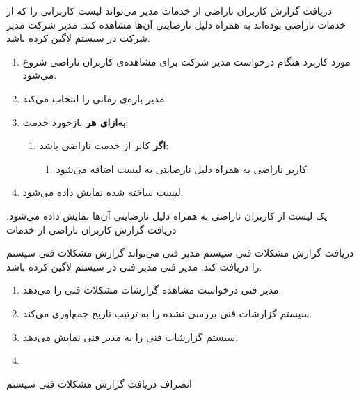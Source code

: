 {
\usecase
{دریافت گزارش کاربران ناراضی از خدمات}
{}
{مدیر می‌تواند لیست کاربرانی را که از خدمات ناراضی بوده‌اند به همراه دلیل نارضایتی آن‌ها مشاهده کند.}
{مدیر شرکت}
{}
{مدیر شرکت در سیستم لاگین کرده باشد.}
{
	\vspace*{-0.6cm}
	\begin{enumerate}
		\item 
		مورد کاربرد هنگام درخواست مدیر شرکت برای مشاهده‌ی کاربران ناراضی شروع می‌شود.
		\item
		مدیر بازه‌ی زمانی را انتخاب می‌کند.
		\item
		\textbf{به‌ازای هر} بازخورد خدمت:
		\begin{enumerate}[label=\theenumi.\arabic*.]
			\item 
			\textbf{اگر} کابر از خدمت ناراضی باشد:
			\begin{enumerate}
				\item 
				کاربر ناراضی به همراه دلیل نارضایتی به لیست اضافه می‌شود.
			\end{enumerate}
		\end{enumerate}
		\item
		لیست ساخته شده نمایش داده می‌شود.
	\end{enumerate}
}
{یک لیست از کاربران ناراضی به همراه دلیل نارضایتی آن‌ها نمایش داده می‌شود.}
{
}
{
	دریافت گزارش کاربران ناراضی از خدمات
}
}

{
	\usecase
	{دریافت گزارش مشکلات فنی سیستم}
	{}
	{مدیر فنی می‌تواند گزارش مشکلات فنی سیستم را دریافت کند.}
	{مدیر فنی}
	{}
	{مدیر فنی در سیستم لاگین کرده باشد.}
	{
		\vspace*{-0.6cm}
		\begin{enumerate}
			\item 
مدیر فنی درخواست مشاهده گزارشات مشکلات فنی را می‌دهد.
			\item
سیستم گزارشات فنی بررسی نشده را به ترتیب تاریخ جمع‌اوری می‌کند.
			\item
سیستم گزارشات فنی را به مدیر فنی نمایش می‌دهد.
			\item
		\end{enumerate}
	}
	{}
	{
		انصراف
	}
	{
		دریافت گزارش مشکلات فنی سیستم
	}
}


